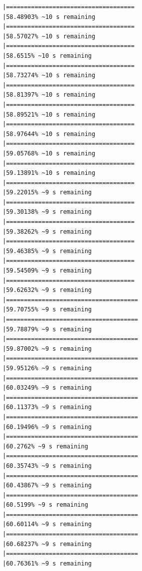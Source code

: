 \documentclass{article}\usepackage[]{graphicx}\usepackage[]{xcolor}
\makeatletter
\newenvironment{kframe}{%
 \def\at@end@of@kframe{}%
 \ifinner\ifhmode%
  \def\at@end@of@kframe{\end{minipage}}%
  \begin{minipage}{\columnwidth}%
 \fi\fi%
 \def\FrameCommand##1{\hskip\@totalleftmargin \hskip-\fboxsep
 \colorbox{shadecolor}{##1}\hskip-\fboxsep
     \hskip-\linewidth \hskip-\@totalleftmargin \hskip\columnwidth}%
 \MakeFramed {\advance\hsize-\width
   \@totalleftmargin\z@ \linewidth\hsize
   \@setminipage}}%
 {\par\unskip\endMakeFramed%
 \at@end@of@kframe}
\newenvironment{knitrout}{}{} %
\makeatother
\begin{document}
\begin{knitrout}
\begin{kframe}
\begin{verbatim}
|====================================                          |58.48903% ~10 s remaining 
|====================================                          |58.57027% ~10 s remaining 
|====================================                          |58.6515% ~10 s remaining  
|====================================                          |58.73274% ~10 s remaining 
|====================================                          |58.81397% ~10 s remaining 
|====================================                          |58.89521% ~10 s remaining 
|====================================                          |58.97644% ~10 s remaining 
|====================================                          |59.05768% ~10 s remaining 
|====================================                          |59.13891% ~10 s remaining 
|====================================                          |59.22015% ~9 s remaining  
|====================================                          |59.30138% ~9 s remaining  
|====================================                          |59.38262% ~9 s remaining  
|====================================                          |59.46385% ~9 s remaining  
|====================================                          |59.54509% ~9 s remaining  
|====================================                          |59.62632% ~9 s remaining  
|=====================================                         |59.70755% ~9 s remaining  
|=====================================                         |59.78879% ~9 s remaining  
|=====================================                         |59.87002% ~9 s remaining  
|=====================================                         |59.95126% ~9 s remaining  
|=====================================                         |60.03249% ~9 s remaining  
|=====================================                         |60.11373% ~9 s remaining  
|=====================================                         |60.19496% ~9 s remaining  
|=====================================                         |60.2762% ~9 s remaining   
|=====================================                         |60.35743% ~9 s remaining  
|=====================================                         |60.43867% ~9 s remaining  
|=====================================                         |60.5199% ~9 s remaining   
|=====================================                         |60.60114% ~9 s remaining  
|=====================================                         |60.68237% ~9 s remaining  
|=====================================                         |60.76361% ~9 s remaining  

\end{verbatim}
\end{kframe}
\end{knitrout}
\end{document}
